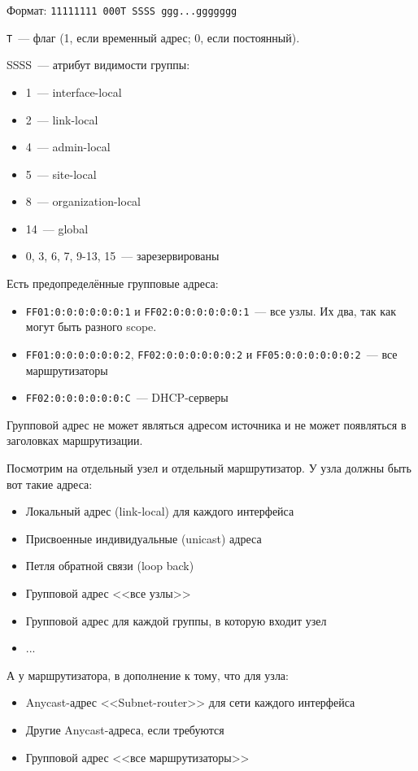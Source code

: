 Формат: {\tt 11111111 000T SSSS ggg...ggggggg}

{\tt T}~--- флаг (1, если временный адрес; 0, если постоянный).

SSSS~--- атрибут видимости группы:
\begin{itemize}
    \item 1~--- interface-local
    \item 2~--- link-local
    \item 4~--- admin-local
    \item 5~--- site-local
    \item 8~--- organization-local
    \item 14~--- global
    \item 0, 3, 6, 7, 9-13, 15~--- зарезервированы
\end{itemize}

Есть предопределённые групповые адреса:
\begin{itemize}
    \item {\tt FF01:0:0:0:0:0:0:1} и {\tt FF02:0:0:0:0:0:0:1}~--- все узлы. Их два, так как могут быть разного scope.
    \item {\tt FF01:0:0:0:0:0:0:2}, {\tt FF02:0:0:0:0:0:0:2} и {\tt FF05:0:0:0:0:0:0:2}~--- все маршрутизаторы
    \item {\tt FF02:0:0:0:0:0:0:С}~--- DHCP-серверы
\end{itemize}

Групповой адрес не может являться адресом источника и не может появляться в заголовках маршрутизации.


Посмотрим на отдельный узел и отдельный маршрутизатор. У узла должны быть вот такие адреса:
\begin{itemize}
    \item Локальный адрес (link-local) для каждого интерфейса
    \item Присвоенные индивидуальные (unicast) адреса
    \item Петля обратной связи (loop back)
    \item Групповой адрес <<все узлы>>
    \item Групповой адрес для каждой группы, в которую входит узел
    \item ...
\end{itemize}

А у маршрутизатора, в дополнение к тому, что для узла:
\begin{itemize}
    \item Anycast-адрес <<Subnet-router>> для сети каждого интерфейса
    \item Другие Anycast-адреса, если требуются
    \item Групповой адрес <<все маршрутизаторы>>
\end{itemize}

